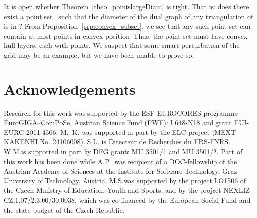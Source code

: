 \documentclass{article}
\begin{document}
It is open whether Theorem~\ref{theo_pointslargeDiam} is tight. That is:
does there exist a point set~ such that the diameter of the dual 
graph of any triangulation of  is in ? From Proposition~\ref{prp:convex_subset}, 
we see that any such point set can contain at most  points
in convex position. 
Thus, the point set must have  convex hull 
layers, each with  points. We suspect that some smart 
perturbation of the grid may be an example, but we have been unable to 
prove so.  


\section*{Acknowledgements}
Research for this work was supported by the ESF EUROCORES
programme EuroGIGA--ComPoSe, Austrian
Science Fund (FWF): I 648-N18 and grant
EUI-EURC-2011-4306. 
M.~K. was supported in part by the ELC project (MEXT KAKENHI No. 24106008).
S.L. is Directeur de Recherches du FRS-FNRS.
W.M.\@ is supported in part by DFG grants
MU 3501/1 and MU 3501/2.
Part of this work has been done while A.P.\ was recipient of a 
DOC-fellowship
of the Austrian Academy of Sciences at
the Institute for Software Technology,
Graz University of Technology, Austria. 
M.S.\@ was supported by the project LO1506 of the Czech Ministry of Education, Youth and Sports, and by the project NEXLIZ CZ.1.07/2.3.00/30.0038, 
which was co-financed by the European Social Fund and the state budget of the Czech Republic.





\end{document}
